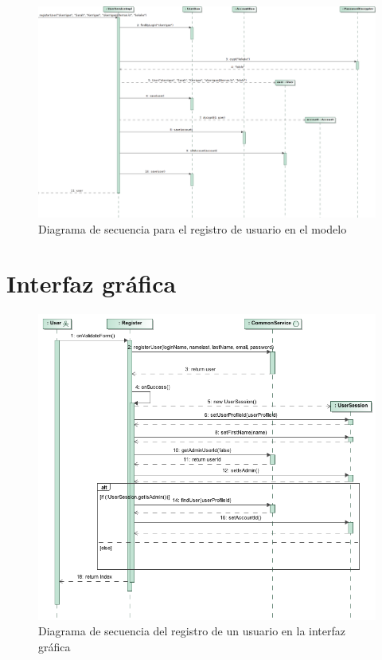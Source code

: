 \documentclass[a4paper,twoside]{article}
\begin{document}
\begin{figure}[htbp]
  \centering
  \caption{Diagrama de secuencia para el registro de usuario en el modelo}
  \includegraphics[width=\textheight,angle=90]{../uml/Sequence_Diagram__Secuencia_UserService__Secuencia_UserService.png}
\end{figure}





\newpage
\section{Interfaz gráfica}

\begin{figure}[H]
  \centering
  \caption{Diagrama de secuencia del registro de un usuario en la interfaz gráfica}
  \includegraphics[width=\textwidth]{../uml/Diagramas_it2_imgs/Sequence_Diagram__SecuenciaWeb_registro__SecuenciaWeb_registro.png}
\end{figure}
\end{document}

